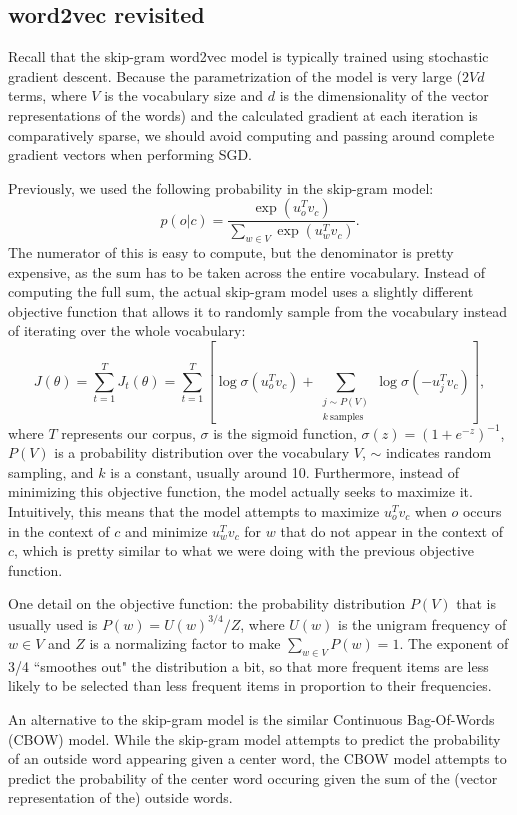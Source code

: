 \subsection{word2vec revisited}
Recall that the skip-gram word2vec model is typically trained using stochastic gradient descent. Because the parametrization of the model is very large ($2Vd$ terms, where $V$ is the vocabulary size and $d$ is the dimensionality of the vector representations of the words) and the calculated gradient at each iteration is comparatively sparse, we should avoid computing and passing around complete gradient vectors when performing SGD.

Previously, we used the following probability in the skip-gram model:
$$p(o|c) = \frac{\exp\left(u_o^T v_c\right)}{\sum_{w\in V}\exp\left(u_w^T v_c\right)}.$$
The numerator of this is easy to compute, but the denominator is pretty expensive, as the sum has to be taken across the entire vocabulary. Instead of computing the full sum, the actual skip-gram model uses a slightly different objective function that allows it to randomly sample from the vocabulary instead of iterating over the whole vocabulary:
$$J(\theta) = \sum_{t=1}^T J_t(\theta) = \sum_{t=1}^T \left[\log \sigma\left(u_o^T v_c\right) + \sum_{\substack{j\sim P(V)\\ k~\text{samples}}} \log \sigma\left(-u_j^T v_c\right)\right],$$
where $T$ represents our corpus, $\sigma$ is the sigmoid function, $\sigma(z) = (1 + e^{-z})^{-1}$, $P(V)$ is a probability distribution over the vocabulary $V$, $\sim$ indicates random sampling, and $k$ is a constant, usually around 10. Furthermore, instead of minimizing this objective function, the model actually seeks to maximize it. Intuitively, this means that the model attempts to maximize $u_o^T v_c$ when $o$ occurs in the context of $c$ and minimize $u_w^T v_c$ for $w$ that do not appear in the context of $c$, which is pretty similar to what we were doing with the previous objective function.

One detail on the objective function: the probability distribution $P(V)$ that is usually used is $P(w) = U(w)^{3/4}/Z$, where $U(w)$ is the unigram frequency of $w \in V$ and $Z$ is a normalizing factor to make $\sum_{w \in V} P(w) = 1$. The exponent of 3/4 ``smoothes out" the distribution a bit, so that more frequent items are less likely to be selected than less frequent items in proportion to their frequencies.

An alternative to the skip-gram model is the similar Continuous Bag-Of-Words (CBOW) model. While the skip-gram model attempts to predict the probability of an outside word appearing given a center word, the CBOW model attempts to predict the probability of the center word occuring given the sum of the (vector representation of the) outside words.


